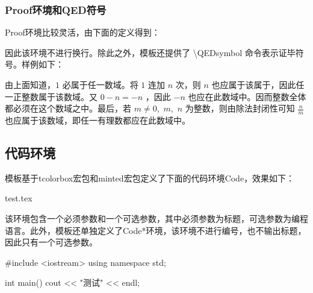 \documentclass{gunote}
\begin{document}
\subsubsection{Proof环境和QED符号}
\textsf{Proof}环境比较灵活，由下面的定义得到：
\begin{Code*}[latex]
\newcommand{\QEDsymbol}{\hfill$\square$}
\newenvironment{Proof}{\textbf{证：}}{\QEDsymbol} %
\end{Code*}
因此该环境不进行换行。除此之外，模板还提供了 \textsf{\backslash QEDsymbol} 命令表示证毕符号。样例如下：

\begin{Proof}
  由上面知道，$1$ 必属于任一数域。将 $1$ 连加 $n$ 次，则 $n$ 也应属于该属于，因此任一正整数属于该数域。又 $0-n=-n$ ，因此 $-n$ 也应在此数域中。因而整数全体都必须在这个数域之中。最后，若 $m\neq 0$,\ $m$,\ $n$ 为整数，则由除法封闭性可知 $\frac{n}{m}$ 也应属于该数域，即任一有理数都应在此数域中。
\end{Proof}
\subsection{代码环境}
模板基于\textsf{tcolorbox}宏包和\textsf{minted}宏包定义了下面的代码环境\textsf{Code}，效果如下：
\begin{Code}{test.tex}
\end{Code}

该环境包含一个必须参数和一个可选参数，其中必须参数为标题，可选参数为编程语言。此外，模板还单独定义了\textsf{Code*}环境，该环境不进行编号，也不输出标题，因此只有一个可选参数。
\begin{Code*}[cpp]
#include <iostream>
using namespace std;

int main() {
  cout << "测试" << endl;
}
\end{Code*}
\end{document}
